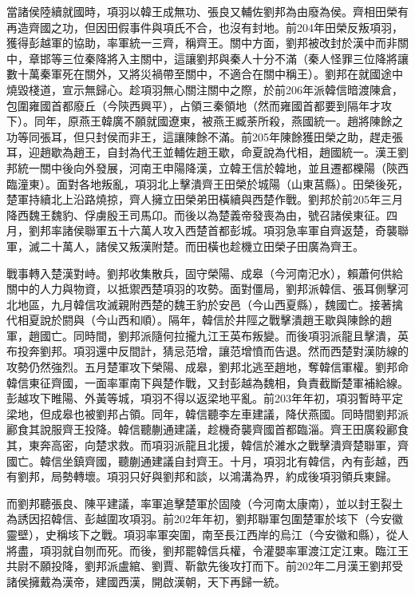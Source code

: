當諸侯陸續就國時，項羽以韓王成無功、張良又輔佐劉邦為由廢為侯。齊相田榮有再造齊國之功，但因田假事件與項氏不合，也沒有封地。前204年田榮反叛項羽，獲得彭越軍的協助，率軍統一三齊，稱齊王。關中方面，劉邦被改封於漢中而非關中，章邯等三位秦降將入主關中，這讓劉邦與秦人十分不滿（秦人怪罪三位降將讓數十萬秦軍死在關外，又將災禍帶至關中，不適合在關中稱王）。劉邦在就國途中燒毀棧道，宣示無歸心。趁項羽無心關注關中之際，於前206年派韓信暗渡陳倉，包圍雍國首都廢丘（今陝西興平），占領三秦領地（然而雍國首都要到隔年才攻下）。同年，原燕王韓廣不願就國遼東，被燕王臧荼所殺，燕國統一。趙將陳餘之功等同張耳，但只封侯而非王，這讓陳餘不滿。前205年陳餘獲田榮之助，趕走張耳，迎趙歇為趙王，自封為代王並輔佐趙王歇，命夏說為代相，趙國統一。漢王劉邦統一關中後向外發展，河南王申陽降漢，立韓王信於韓地，並且遷都櫟陽（陝西臨潼東）。面對各地叛亂，項羽北上擊潰齊王田榮於城陽（山東莒縣）。田榮後死，楚軍持續北上沿路燒掠，齊人擁立田榮弟田橫續與西楚作戰。劉邦於前205年三月降西魏王魏豹、俘虜殷王司馬卬。而後以為楚義帝發喪為由，號召諸侯東征。四月，劉邦率諸侯聯軍五十六萬人攻入西楚首都彭城。項羽急率軍自齊返楚，奇襲聯軍，滅二十萬人，諸侯又叛漢附楚。而田橫也趁機立田榮子田廣為齊王。

戰事轉入楚漢對峙。劉邦收集散兵，固守榮陽、成皋（今河南汜水），賴蕭何供給關中的人力與物資，以抵禦西楚項羽的攻勢。面對僵局，劉邦派韓信、張耳側擊河北地區，九月韓信攻滅親附西楚的魏王豹於安邑（今山西夏縣），魏國亡。接著擒代相夏說於閼與（今山西和順）。隔年，韓信於井陘之戰擊潰趙王歇與陳餘的趙軍，趙國亡。同時間，劉邦派隨何拉攏九江王英布叛變。而後項羽派龍且擊潰，英布投奔劉邦。項羽還中反間計，猜忌范增，讓范增憤而告退。然而西楚對漢防線的攻勢仍然強烈。五月楚軍攻下榮陽、成皋，劉邦北逃至趙地，奪韓信軍權。劉邦命韓信東征齊國，一面率軍南下與楚作戰，又封彭越為魏相，負責截斷楚軍補給線。彭越攻下睢陽、外黃等城，項羽不得以返梁地平亂。前203年年初，項羽暫時平定梁地，但成皋也被劉邦占領。同年，韓信聽李左車建議，降伏燕國。同時間劉邦派酈食其說服齊王投降。韓信聽蒯通建議，趁機奇襲齊國首都臨淄。齊王田廣殺酈食其，東奔高密，向楚求救。而項羽派龍且北援，韓信於濰水之戰擊潰齊楚聯軍，齊國亡。韓信坐鎮齊國，聽蒯通建議自封齊王。十月，項羽北有韓信，內有彭越，西有劉邦，局勢轉壞。項羽只好與劉邦和談，以鴻溝為界，約成後項羽領兵東歸。

而劉邦聽張良、陳平建議，率軍追擊楚軍於固陵（今河南太康南），並以封王裂土為誘因招韓信、彭越圍攻項羽。前202年年初，劉邦聯軍包圍楚軍於垓下（今安徽靈壁），史稱垓下之戰。項羽率軍突圍，南至長江西岸的烏江（今安徽和縣），從人將盡，項羽就自刎而死。而後，劉邦罷韓信兵權，令灌嬰率軍渡江定江東。臨江王共尉不願投降，劉邦派盧綰、劉賈、靳歙先後攻打而下。前202年二月漢王劉邦受諸侯擁戴為漢帝，建國西漢，開啟漢朝，天下再歸一統。

